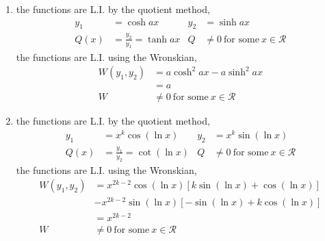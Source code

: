 \begin{enumerate}
    \item the functions are L.I. by the quotient method,
          \begin{align}
              y_{1} & = \cosh ax                       & y_{2} & = \sinh ax                                 \\
              Q(x)  & = \frac{y_{2}}{y_{1}} = \tanh ax & Q     & \neq 0\ \text{for some}\ x \in \mathcal{R}
          \end{align}
          the functions are L.I. using the Wronskian,
          \begin{align}
              W(y_{1}, y_{2}) & = a\cosh^{2} ax - a\sinh^{2} ax            \\
                              & = a                                        \\
              W               & \neq 0\ \text{for some}\ x \in \mathcal{R}
          \end{align}

    \item the functions are L.I. by the quotient method,
          \begin{align}
              y_{1} & = x^{k}\cos(\ln x)                  & y_{2} & = x^{k}\sin(\ln x)                         \\
              Q(x)  & = \frac{y_{1}}{y_{2}} = \cot(\ln x) & Q     & \neq 0\ \text{for some}\ x \in \mathcal{R}
          \end{align}
          the functions are L.I. using the Wronskian,
          \begin{align}
              W(y_{1}, y_{2}) & = x^{2k-2}\cos(\ln x)[ k\sin(\ln x) + \cos(\ln x)] \\
                              & - x^{2k-2}\sin(\ln x)[-\sin(\ln x) + k\cos(\ln x)] \\
                              & = x^{2k-2}                                         \\
              W               & \neq 0\ \text{for some}\ x \in \mathcal{R}
          \end{align}


\end{enumerate}
